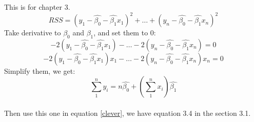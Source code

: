 \documentclass{article}
\begin{document}
This is for chapter 3. \\
\begin{equation}
RSS = (y_1 - \hat{\beta_0} - \hat{\beta_1}x_1)^2 + \dots + (y_n - \hat{\beta_0} - \hat{\beta_1}x_n)^2
\end{equation}
Take derivative to $\beta_0$ and $\beta_1$, and set them to 0:
\begin{equation}
-2(y_1 - \hat{\beta_0} - \hat{\beta_1}x_1) - \dots - 2(y_n - \hat{\beta_0} - \hat{\beta_1}x_n) = 0
\end{equation}
\begin{equation}
-2(y_1 - \hat{\beta_0} - \hat{\beta_1}x_1)x_1 - \dots - 2(y_n - \hat{\beta_0} - \hat{\beta_1}x_n)x_n = 0 \label{clever}
\end{equation}
Simplify them, we get:
\begin{equation}
\sum_1^n y_i = n\hat{\beta_0} + (\sum_1^n x_i) \hat{\beta_1}
\end{equation} \\
Then use this one in equation \eqref{clever}, we have equation 3.4 in the section 3.1.                                                                                                     
\end{document}
